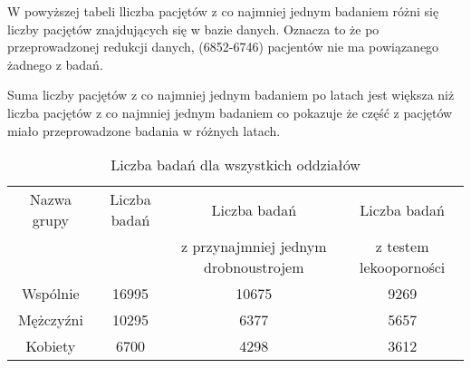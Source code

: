 \documentclass[a4paper,11pt]{article}
\begin{document}
W powyższej tabeli lliczba pacjętów z co najmniej jednym badaniem różni się liczby pacjętów znajdujących się w bazie danych.
Oznacza to że po przeprowadzonej redukcji danych, (6852-6746) pacjentów nie ma powiązanego żadnego z badań.

Suma liczby pacjętów z co najmniej jednym badaniem po latach jest większa niż liczba pacjętów z co najmniej jednym badaniem co pokazuje że część z pacjętów miało przeprowadzone badania w różnych latach.

\begin{table}[H]
  \begin{center}
  \caption{Liczba badań dla wszystkich oddziałów }
  \begin{tabular}{c|c|c|c}
  \hline
  Nazwa grupy & Liczba badań & Liczba badań & Liczba badań\\ 
              &              & z przynajmniej jednym drobnoustrojem &z testem lekooporności \\ \hline
              Wspólnie &16995 &10675& 9269 \\
              Mężczyźni &10295 &6377& 5657 \\
              Kobiety &6700 &4298& 3612 \\ \hline
  \end{tabular}
\end{center}
\end{table}
\end{document}
